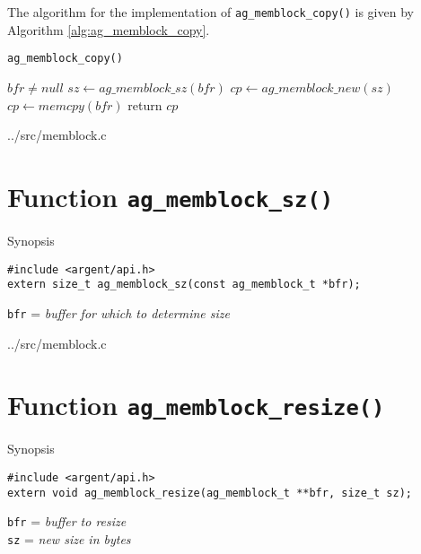 The algorithm for the implementation of \verb|ag_memblock_copy()| is given by
Algorithm \ref{alg:ag_memblock_copy}.

\begin{algorithm}
\scriptsize
\caption{\texttt{ag\_memblock\_copy()}}
\label{alg:ag_memblock_copy}
\begin{algorithmic}
\Require $bfr \neq null$
\State $sz \gets ag\_memblock\_sz(bfr)$ 
\State $cp \gets ag\_memblock\_new(sz)$ 
\State $cp \gets memcpy(bfr)$ 
\State return $cp$
\EndProcedure
\end{algorithmic}
\end{algorithm}

\lstset{style=CODE}

  {../src/memblock.c}


%


\section{Function \texttt{ag\_memblock\_sz()}}
  \begin{bclogo}[logo=\bccrayon, noborder=true, barre=snake, couleurBarre=gray]
    {Synopsis}
  \lstset{style=SYNOPSIS}
  \begin{lstlisting}[linewidth=1.0\linewidth]
#include <argent/api.h>
extern size_t ag_memblock_sz(const ag_memblock_t *bfr);
  \end{lstlisting}
  \scriptsize
  \texttt{bfr} = \emph{buffer for which to determine size}
  \end{bclogo}

\lstset{style=CODE}

  {../src/memblock.c}


%


\section{Function \texttt{ag\_memblock\_resize()}}
  \begin{bclogo}[logo=\bccrayon, noborder=true, barre=snake, couleurBarre=gray]
    {Synopsis}
  \lstset{style=SYNOPSIS}
  \begin{lstlisting}[linewidth=1.0\linewidth]
#include <argent/api.h>
extern void ag_memblock_resize(ag_memblock_t **bfr, size_t sz);
  \end{lstlisting}
  \scriptsize
  \texttt{bfr} = \emph{buffer to resize} \\
  \texttt{sz} = \emph{new size in bytes}
  \end{bclogo}

